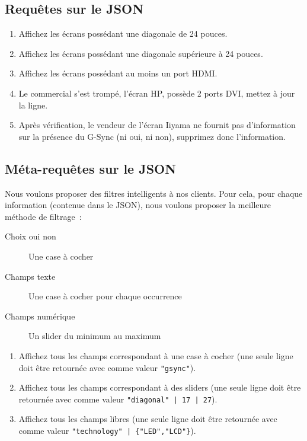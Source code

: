 \documentclass[a4paper,10pt]{article}
\begin{document}
  \subsection{Requêtes sur le JSON}
    \begin{enumerate}
      \item Affichez les écrans possédant une diagonale de 24 pouces.
      \item Affichez les écrans possédant une diagonale supérieure à 24 pouces.
      \item Affichez les écrans possédant au moins un port HDMI.
      \item Le commercial s'est trompé, l'écran HP, possède 2 ports DVI, mettez à jour la ligne.
      \item Après vérification, le vendeur de l'écran Iiyama ne fournit pas d'information sur la présence du G-Sync (ni oui, ni non), supprimez donc l'information.
    \end{enumerate}

  \subsection{Méta-requêtes sur le JSON}
    Nous voulons proposer des filtres intelligents à nos clients. Pour cela, pour chaque information (contenue dans le JSON), nous voulons proposer la meilleure méthode de filtrage :
    \begin{description}
        \item[Choix oui non] Une case à cocher
        \item[Champs texte] Une case à cocher pour chaque occurrence
        \item[Champs numérique] Un slider du minimum au maximum
   \end{description}

    \vspace{10px}

   \begin{enumerate}
     \item Affichez tous les champs correspondant à une case à cocher (une seule ligne doit être retournée avec comme valeur \texttt{"gsync"}).
     \item Affichez tous les champs correspondant à des sliders (une seule ligne doit être retournée avec comme valeur \texttt{"diagonal" |  17 |  27}).
     \item Affichez tous les champs libres (une seule ligne doit être retournée avec comme valeur \texttt{"technology" | \{"LED","LCD"\}}).
   \end{enumerate}
\end{document}
